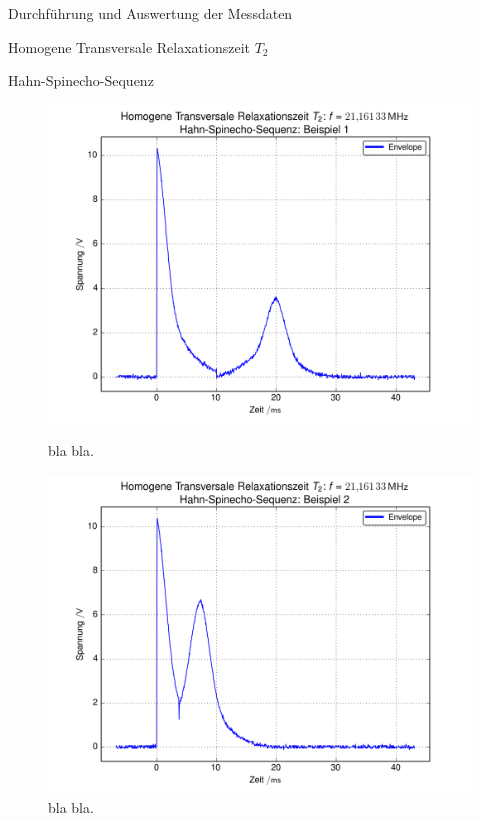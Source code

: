 \documentclass[pdftex, a4paper,11pt, twoside, ngerman]{report}
\begin{document}
\begin{chapter}{Durchführung und Auswertung der Messdaten}
\begin{section}{
        Homogene Transversale Relaxationszeit $T_{2}$}
      \begin{subsection}{Hahn-Spinecho-Sequenz}
        \label{chpHomoTransRelaxHahn}
        
        
        
        
        \begin{figure}[htb]
          \centering
          \begin{minipage}{.48\textwidth}
            \centering
            \includegraphics[width=\textwidth]
            {Figures/HomoTransRelax_Hahn_beispiel0.png}
            \caption{bla bla.}
            \label{figHahnBsp1}
          \end{minipage}\quad
          \begin{minipage}{.48\textwidth}
            \centering
            \includegraphics[width=\textwidth]
            {Figures/HomoTransRelax_Hahn_beispiel1.png}
            \caption{bla bla.}
            \label{figHahnBsp2}
          \end{minipage}
        \end{figure}
        

\end{subsection}
\end{section}
\end{chapter}
\end{document}
